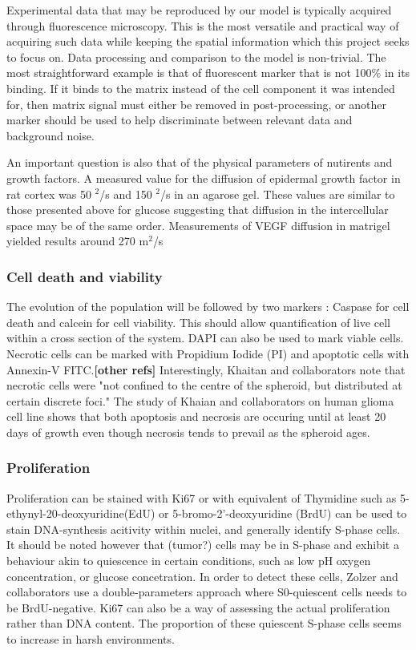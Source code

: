 \documentclass[11pt,a4paper]{article}
\begin{document}
Experimental data that may be reproduced by our model is typically acquired through fluorescence microscopy. This is the most versatile and practical way of acquiring such data while keeping the spatial information which this project seeks to focus on. Data processing and comparison to the model is non-trivial. The most straightforward example is that of fluorescent marker that is not 100\% in its binding. If it binds to the matrix instead of the cell component it was intended for, then matrix signal must either be removed in post-processing, or another marker should be used to help discriminate between relevant data and background noise.

An important question is also that of the physical parameters of nutirents and growth factors. A measured value for the diffusion of epidermal growth factor in rat cortex was 50 \textmu $^2$/s and 150  \textmu $^2$/s in an agarose gel. These values are similar to those presented above for glucose suggesting that diffusion in the intercellular space may be of the same order. Measurements of VEGF diffusion in matrigel yielded results around 270 \textmu m$^2$/s 

\subsubsection{Cell death and viability}
The evolution of the population will be followed by two markers : Caspase for cell death and calcein for cell viability. This should allow quantification of live cell within a cross section of the system. DAPI can also be used to mark viable cells.
Necrotic cells can be marked with Propidium Iodide (PI)  and apoptotic cells with Annexin-V FITC.\cite{Khaitan2006}\textbf{[other refs]} Interestingly, Khaitan and collaborators note that necrotic cells were "not confined to the centre of the spheroid, but distributed at certain discrete foci."\cite{Khaitan2006} The study of Khaian and collaborators on human glioma cell line shows that both apoptosis and necrosis are occuring until at least 20 days of growth even though necrosis tends to prevail as the spheroid ages. 

\subsubsection{Proliferation}
Proliferation can be stained with Ki67 \cite{Grimes2014}\cite{Ghaffarizadeh2017} or with equivalent of Thymidine such as 5-ethynyl-20-deoxyuridine(EdU) or  5-bromo-2'-deoxyuridine (BrdU) can be used to stain DNA-synthesis acitivity within nuclei, and generally identify S-phase cells. It should be noted however that (tumor?) cells may be in S-phase and exhibit a behaviour akin to quiescence in certain conditions, such as low pH oxygen concentration, or glucose concetration. \cite{Zolzer1999}\cite{Khaitan2006} In order to detect these cells, Zolzer and collaborators use a double-parameters approach where S0-quiescent cells needs to be BrdU-negative. Ki67 can also be a way of assessing the actual proliferation rather than DNA content. The proportion of these quiescent S-phase cells seems to increase in harsh environments.
 
\end{document}
